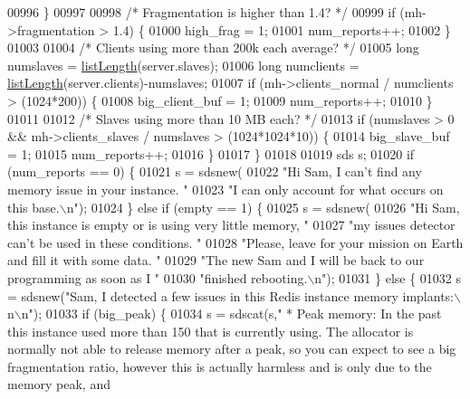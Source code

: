 \begin{DoxyCode}
{{00996         \}
00997 
00998         \textcolor{comment}{/* Fragmentation is higher than 1.4? */}
00999         \textcolor{keywordflow}{if} (mh->fragmentation > 1.4) \{
01000             high\_frag = 1;
01001             num\_reports++;
01002         \}
01003 
01004         \textcolor{comment}{/* Clients using more than 200k each average? */}
01005         \textcolor{keywordtype}{long} numslaves = \hyperlink{adlist_8h_afde0ab079f934670e82119b43120e94b}{listLength}(server.slaves);
01006         \textcolor{keywordtype}{long} numclients = \hyperlink{adlist_8h_afde0ab079f934670e82119b43120e94b}{listLength}(server.clients)-numslaves;
01007         \textcolor{keywordflow}{if} (mh->clients\_normal / numclients > (1024*200)) \{
01008             big\_client\_buf = 1;
01009             num\_reports++;
01010         \}
01011 
01012         \textcolor{comment}{/* Slaves using more than 10 MB each? */}
01013         \textcolor{keywordflow}{if} (numslaves > 0 && mh->clients\_slaves / numslaves > (1024*1024*10)) \{
01014             big\_slave\_buf = 1;
01015             num\_reports++;
01016         \}
01017     \}
01018 
01019     sds s;
01020     \textcolor{keywordflow}{if} (num\_reports == 0) \{
01021         s = sdsnew(
01022         \textcolor{stringliteral}{"Hi Sam, I can't find any memory issue in your instance. "}
01023         \textcolor{stringliteral}{"I can only account for what occurs on this base.\(\backslash\)n"});
01024     \} \textcolor{keywordflow}{else} \textcolor{keywordflow}{if} (empty == 1) \{
01025         s = sdsnew(
01026         \textcolor{stringliteral}{"Hi Sam, this instance is empty or is using very little memory, "}
01027         \textcolor{stringliteral}{"my issues detector can't be used in these conditions. "}
01028         \textcolor{stringliteral}{"Please, leave for your mission on Earth and fill it with some data. "}
01029         \textcolor{stringliteral}{"The new Sam and I will be back to our programming as soon as I "}
01030         \textcolor{stringliteral}{"finished rebooting.\(\backslash\)n"});
01031     \} \textcolor{keywordflow}{else} \{
01032         s = sdsnew(\textcolor{stringliteral}{"Sam, I detected a few issues in this Redis instance memory implants:\(\backslash\)n\(\backslash\)n"});
01033         \textcolor{keywordflow}{if} (big\_peak) \{
01034             s = sdscat(s,\textcolor{stringliteral}{" * Peak memory: In the past this instance used more than 150%
       that is currently using. The allocator is normally not able to release memory after a peak, so you can expect
       to see a big fragmentation ratio, however this is actually harmless and is only due to the memory peak, and
}}}
\end{DoxyCode}

